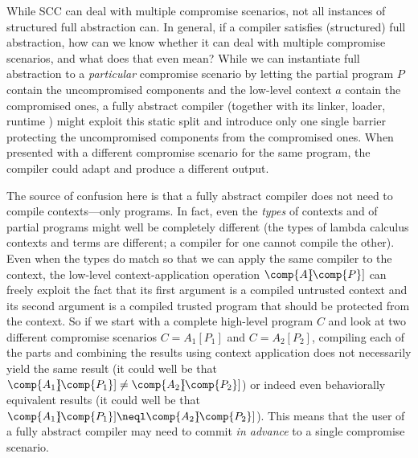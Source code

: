 \documentclass[10pt, conference, compsocconf, letterpaper, times]{IEEEtran}
\begin{document}
\ifsooner
{}

\fi


While SCC can deal with multiple
compromise scenarios, not all instances of structured full abstraction
can.
In general, if a compiler satisfies (structured) full abstraction,
how can we know whether it can deal with multiple compromise scenarios,
and what does that even mean?
While we can instantiate full abstraction to a
{\em particular} compromise scenario by
letting the partial program $P$ contain the uncompromised components and the
low-level context $a$ contain the compromised ones, a
fully abstract compiler
(together with its linker, loader, runtime \ETC) might exploit this
static split and introduce only one single barrier protecting the
uncompromised components from the compromised ones.
When presented with a different compromise scenario for the same program,
the compiler could adapt and produce a different output.

The source of confusion here is that a fully abstract compiler does not need
to compile contexts---only programs. In fact, even the {\em types} of
contexts and of partial programs might well be completely different (\EG the
types of lambda calculus contexts and terms are different; a compiler for
one cannot compile the other).
Even when the types do match so that we can apply the same
compiler to the context, the low-level context-application operation
$\comp{A}\hspace{-0.35em}[\comp{P}]$ can freely exploit the fact
that its first argument is a compiled untrusted context and its second
argument is a compiled trusted program that should be protected from
the context.
So if we start with a complete high-level program $C$ and
look at two different compromise scenarios $C = A_1[P_1]$ and
$C = A_2[P_2]$, compiling each of the parts and combining the results
using context application does not necessarily yield the same result
(\IE it could well be that
$\comp{A_1}\hspace{-0.35em}[\comp{P_1}] \not=
\comp{A_2}\hspace{-0.35em}[\comp{P_2}]$) or indeed even behaviorally
equivalent results (\IE it could well be  that
$\comp{A_1}\hspace{-0.35em}[\comp{P_1}] \neql
\comp{A_2}\hspace{-0.35em}[\comp{P_2}]$).
This means that the user of a fully abstract compiler may need to commit
{\em in advance} to a single compromise scenario.
\end{document}
